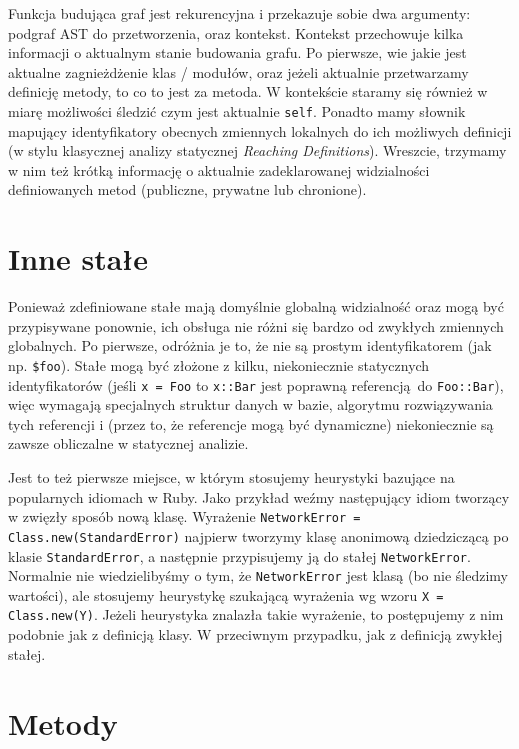 \documentclass[shortabstract,mgr]{iithesis}
\begin{document}
Funkcja budująca graf jest rekurencyjna i przekazuje sobie dwa argumenty: podgraf AST do przetworzenia, oraz kontekst. Kontekst przechowuje kilka informacji o aktualnym stanie budowania grafu. Po pierwsze, wie jakie jest aktualne zagnieżdżenie klas / modułów, oraz jeżeli aktualnie przetwarzamy definicję metody, to co to jest za metoda. W kontekście staramy się również w miarę możliwości śledzić czym jest aktualnie \texttt{self}. Ponadto mamy słownik mapujący identyfikatory obecnych zmiennych lokalnych do ich możliwych definicji (w stylu klasycznej analizy statycznej \emph{Reaching Definitions}). Wreszcie, trzymamy w nim też krótką informację o aktualnie zadeklarowanej widzialności definiowanych metod (publiczne, prywatne lub chronione).

\section{Inne stałe}

Ponieważ zdefiniowane stałe mają domyślnie globalną widzialność oraz mogą być przypisywane ponownie, ich obsługa nie różni się bardzo od zwykłych zmiennych globalnych. Po pierwsze, odróżnia je to, że nie są prostym identyfikatorem (jak np. \texttt{\$foo}). Stałe mogą być złożone z kilku, niekoniecznie statycznych identyfikatorów (jeśli \texttt{x = Foo} to \texttt{x::Bar} jest poprawną referencją do \texttt{Foo::Bar}), więc wymagają specjalnych struktur danych w bazie, algorytmu rozwiązywania tych referencji i (przez to, że referencje mogą być dynamiczne) niekoniecznie są zawsze obliczalne w statycznej analizie.

Jest to też pierwsze miejsce, w którym stosujemy heurystyki bazujące na popularnych idiomach w Ruby. Jako przykład weźmy następujący idiom tworzący w zwięzły sposób nową klasę. Wyrażenie \texttt{NetworkError = Class.new(StandardError)} najpierw tworzymy klasę anonimową dziedziczącą po klasie \texttt{StandardError}, a następnie przypisujemy ją do stałej \texttt{NetworkError}. Normalnie nie wiedzielibyśmy o tym, że \texttt{NetworkError} jest klasą (bo nie śledzimy wartości), ale stosujemy heurystykę szukającą wyrażenia wg wzoru \texttt{X = Class.new(Y)}. Jeżeli heurystyka znalazła takie wyrażenie, to postępujemy z nim podobnie jak z definicją klasy. W przeciwnym przypadku, jak z definicją zwykłej stałej.

\section{Metody}
\end{document}
